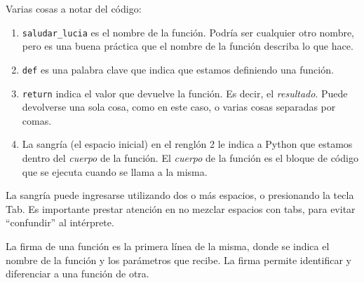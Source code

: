 \documentclass[
  letterpaper,
  DIV=11,
  numbers=noendperiod]{scrreprt}
\providecommand{\tightlist}{%
  \setlength{\itemsep}{0pt}\setlength{\parskip}{0pt}}\usepackage{longtable,booktabs,array}
\begin{document}
Varias cosas a notar del código:

\begin{enumerate}
\def\labelenumi{\arabic{enumi}.}
\tightlist
\item
  \texttt{saludar\_lucia} es el nombre de la función. Podría ser
  cualquier otro nombre, pero es una buena práctica que el nombre de la
  función describa lo que hace.\\
\item
  \texttt{def} es una palabra clave que indica que estamos definiendo
  una función.\\
\item
  \texttt{return} indica el valor que devuelve la función. Es decir, el
  \emph{resultado}. Puede devolverse una sola cosa, como en este caso, o
  varias cosas separadas por comas.\\
\item
  La sangría (el espacio inicial) en el renglón 2 le indica a Python que
  estamos dentro del \emph{cuerpo} de la función. El \emph{cuerpo} de la
  función es el bloque de código que se ejecuta cuando se llama a la
  misma.\\
\end{enumerate}

\begin{tcolorbox}[enhanced jigsaw, colframe=quarto-callout-note-color-frame, opacityback=0, opacitybacktitle=0.6, bottomrule=.15mm, toprule=.15mm, coltitle=black, breakable, colback=white, leftrule=.75mm, titlerule=0mm, bottomtitle=1mm, toptitle=1mm, rightrule=.15mm, title=\textcolor{quarto-callout-note-color}{\faInfo}\hspace{0.5em}{Sangría}, arc=.35mm, left=2mm, colbacktitle=quarto-callout-note-color!10!white]

La sangría puede ingresarse utilizando dos o más espacios, o presionando
la tecla Tab. Es importante prestar atención en no mezclar espacios con
tabs, para evitar ``confundir'' al intérprete.

\end{tcolorbox}

\begin{tcolorbox}[enhanced jigsaw, colframe=quarto-callout-tip-color-frame, opacityback=0, opacitybacktitle=0.6, bottomrule=.15mm, toprule=.15mm, coltitle=black, breakable, colback=white, leftrule=.75mm, titlerule=0mm, bottomtitle=1mm, toptitle=1mm, rightrule=.15mm, title=\textcolor{quarto-callout-tip-color}{\faLightbulb}\hspace{0.5em}{Firma de la función}, arc=.35mm, left=2mm, colbacktitle=quarto-callout-tip-color!10!white]

La firma de una función es la primera línea de la misma, donde se indica
el nombre de la función y los parámetros que recibe. La firma permite
identificar y diferenciar a una función de otra.

\end{tcolorbox}
\end{document}

